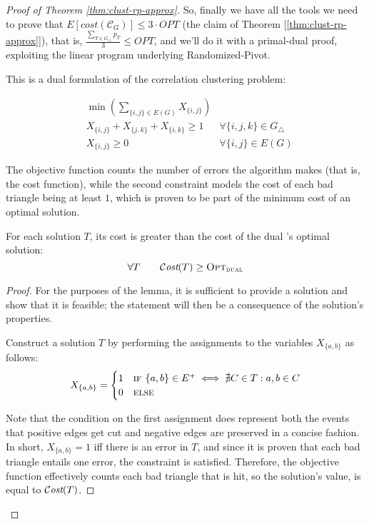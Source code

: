 \begin{proof}[Proof of Theorem \ref{thm:clust-rp-approx}]
    So, finally we have all the tools we need to prove that $E\left[cost\left( \mathscr{C}_G \right)\right] \leq 3 \cdot OPT$ (the claim of Theorem [\ref{thm:clust-rp-approx}]), that is, $\frac{\sum_{T \in G_\triangle} p_T}{3} \leq OPT$, and we'll do it with a primal-dual proof, exploiting the linear program underlying Randomized-Pivot.
    
    This is a dual \lp{} formulation of the correlation clustering problem:
    
        \begin{align*} \label{lp:clust-dual}
            & \min \left( \sum_{\{i, j\} \in E(G)} X_{\{i, j\}} \right) & \\
            & X_{\{i, j\}} + X_{\{j, k\}} + X_{\{i, k\}} \geq 1         & \forall \{i, j, k\} \in G_\triangle \\
            & X_{\{i, j\}} \geq 0                                       & \forall \{i, j\} \in E(G)
        \end{align*}
    
    The objective function counts the number of errors the algorithm makes (that is, the cost function), while the second constraint models the cost of each bad triangle being at least $1$, which is proven to be part of the minimum cost of an optimal solution.
    
    \begin{lemma}\label{l:clust-3}
        For each solution $T$, its cost is greater than the cost of the dual \lp's optimal solution:
        \[
            \forall T \qquad \mathcal{C}\textit{ost}(T) \geq \textsc{Opt}_\textsc{dual}
        \]
    \end{lemma}

    \begin{proof}
        For the purposes of the lemma, it is sufficient to provide a solution and show that it is feasible; the statement will then be a consequence of the \lp{} solution's properties.
        
        Construct a solution $T$ by performing the assignments to the variables $X_{\{a, b\}}$ as follows:
        \[
            X_{\{a, b\}} = \begin{cases}
                1 & \textsc{if } \{a, b\} \in E^+ \iff \nexists C \in T : a, b \in C \\
                0 & \textsc{else}
            \end{cases}
        \]

        Note that the condition on the first assignment does represent both the events that positive edges get cut and negative edges are preserved in a concise fashion. In short, $X_{\{a, b\}} = 1$ iff there is an error in $T$, and since it is proven that each bad triangle entails one error, the constraint is satisfied. Therefore, the objective function effectively counts each bad triangle that is hit, so the solution's value, is equal to $\mathcal{C}\textit{ost}(T)$.
    \end{proof}
    

\end{proof}
